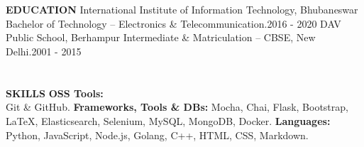 \documentclass[a4paper, 12pt]{article}
\begin{document}
\section*{}
\begin{vwcol}[widths={0.2, 0.8}, justify=flush, sep=0.7cm, rule=0pt, indent=1em]
\large{\textbf{\textcolor{uclagold}{EDUCATION}}}\newline\newline\newline\newline\newline\newline\newline
\large{International Institute of Information Technology, Bhubaneswar}\vspace{-0.05cm}\newline
\small{\textcolor{frenchblue}{Bachelor of Technology} -- \textcolor{frenchblue}{Electronics \& Telecommunication}}.\hspace{3.05cm}\tiny{2016 - 2020}\vspace{0.2cm}\newline
\large{DAV Public School, Berhampur}\vspace{-0.05cm}\newline
\small{\textcolor{frenchblue}{Intermediate \& Matriculation} -- \textcolor{frenchblue}{CBSE, New Delhi}}.\hspace{4.65cm}\tiny{2001 - 2015}\vspace{-0.05cm}\newline
\normalsize
\end{vwcol}

\vspace{-2.2cm}

\section*{}
\begin{vwcol}[widths={0.2, 0.8}, justify=flush, sep=0.7cm, rule=0pt, indent=1em]
\large{\textbf{\textcolor{uclagold}{SKILLS}}}\newline\newline\newline\newline\newline\newline\newline\newline\newline
\large{\textbf{OSS Tools:\\} Git \& GitHub.}\vspace{0.1cm}\newline
\large{\textbf{Frameworks, Tools \& DBs:} Mocha, Chai, Flask, Bootstrap, LaTeX, Elasticsearch, Selenium, MySQL, MongoDB, Docker.}\vspace{0.1cm}\newline
\large{\textbf{Languages:} Python, JavaScript, Node.js, Golang, C++, HTML, CSS, Markdown.}\vspace{0.1cm}\newline
\end{vwcol}
\end{document}
